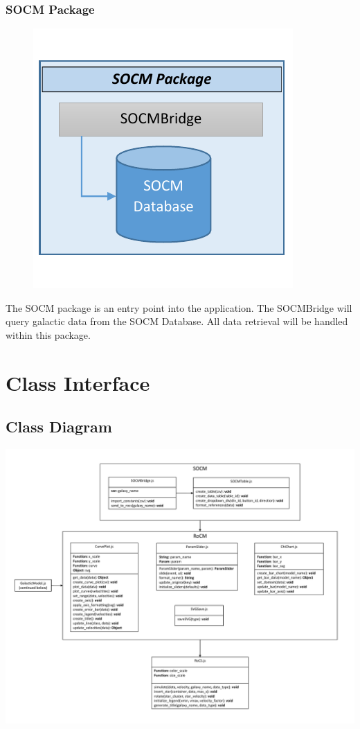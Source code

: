 \documentclass[titlepage]{article}
\begin{document}
\subsubsection{SOCM Package}
\begin{minipage}{\textwidth}
\begin{figure}
  \vspace{-20pt}
  \begin{center}
	\includegraphics{socm_package.pdf}
  \end{center}
\end{figure}
The SOCM package is an entry point into the application. The SOCMBridge will query galactic data from the SOCM Database. All data retrieval will be handled within this package.
\end{minipage}

\vspace*{+100pt}

\section{Class Interface}
\subsection{Class Diagram}
\includegraphics[width=\textwidth,height=\textheight,keepaspectratio]{decomposition_description_SOCMRoCMRoCS.pdf}
\end{document}

